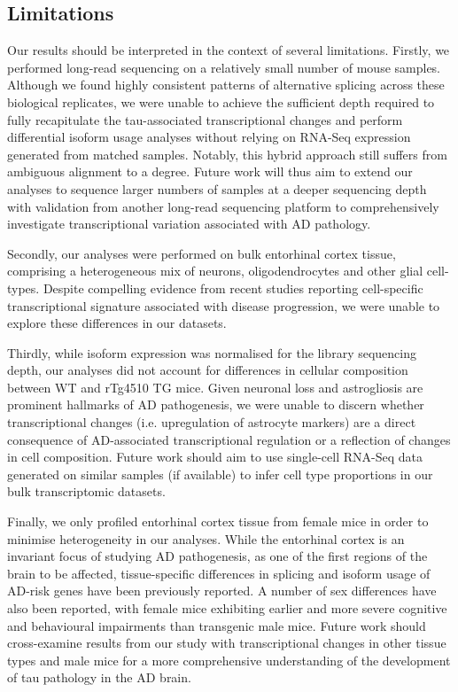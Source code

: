 \subsection{Limitations}
Our results should be interpreted in the context of several limitations. Firstly, we performed long-read sequencing on a relatively small number of mouse samples. Although we found highly consistent patterns of alternative splicing across these biological replicates, we were unable to achieve the sufficient depth required to fully recapitulate the tau-associated transcriptional changes and perform differential isoform usage analyses without relying on RNA-Seq expression generated from matched samples. Notably, this hybrid approach still suffers from ambiguous alignment to a degree. Future work will thus aim to extend our analyses to sequence larger numbers of samples at a deeper sequencing depth with validation from another long-read sequencing platform to comprehensively investigate transcriptional variation associated with AD pathology. 

Secondly, our analyses were performed on bulk entorhinal cortex tissue, comprising a heterogeneous mix of neurons, oligodendrocytes and other glial cell-types. Despite compelling evidence from recent studies reporting cell-specific transcriptional signature associated with disease progression, we were unable to explore these differences in our datasets. 

Thirdly, while isoform expression was normalised for the library sequencing depth, our analyses did not account for differences in cellular composition between WT and rTg4510 TG mice. Given neuronal loss and astrogliosis are prominent hallmarks of AD pathogenesis, we were unable to discern whether transcriptional changes (i.e. upregulation of astrocyte markers) are a direct consequence of AD-associated transcriptional regulation or a reflection of changes in cell composition. Future work should aim to use single-cell RNA-Seq data generated on similar samples (if available) to infer cell type proportions in our bulk transcriptomic datasets. 

Finally, we only profiled entorhinal cortex tissue from female mice in order to minimise heterogeneity in our analyses. While the entorhinal cortex is an invariant focus of studying AD pathogenesis, as one of the first regions of the brain to be affected, tissue-specific differences in splicing and isoform usage of AD-risk genes have been previously reported\cite{Monti2021}. A number of sex differences have also been reported, with female mice exhibiting earlier and more severe cognitive and behavioural impairments than transgenic male mice\cite{M2011}. Future work should cross-examine results from our study with transcriptional changes in other tissue types and male mice for a more comprehensive understanding of the development of tau pathology in the AD brain. 

